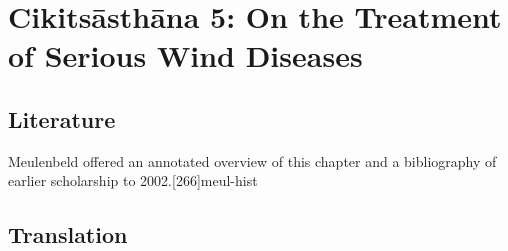 
\chapter{Cikitsāsthāna 5:  On the Treatment of Serious Wind 
Diseases}

\section{Literature} 

Meulenbeld offered an annotated overview of this chapter and a bibliography
of earlier scholarship to 2002.[266]{meul-hist} 

\section{Translation}

